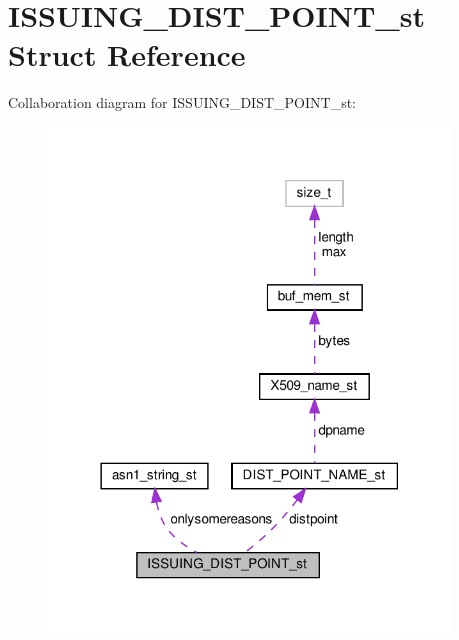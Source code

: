 \hypertarget{structISSUING__DIST__POINT__st}{}\section{I\+S\+S\+U\+I\+N\+G\+\_\+\+D\+I\+S\+T\+\_\+\+P\+O\+I\+N\+T\+\_\+st Struct Reference}
\label{structISSUING__DIST__POINT__st}


Collaboration diagram for I\+S\+S\+U\+I\+N\+G\+\_\+\+D\+I\+S\+T\+\_\+\+P\+O\+I\+N\+T\+\_\+st\+:
\nopagebreak
\begin{figure}[H]
\begin{center}
\leavevmode
\includegraphics[width=302pt]{structISSUING__DIST__POINT__st__coll__graph}
\end{center}
\end{figure}
